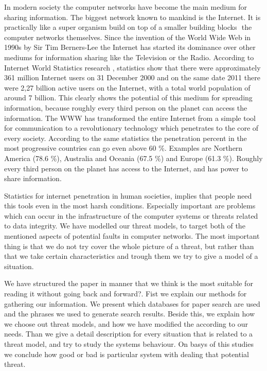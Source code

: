 In modern society the computer networks have become the main medium for sharing information. The  biggest network known to mankind is the Internet. It is practically like a super organism build on top of a smaller building blocks  the computer networks themselves. Since the invention of the World Wide Web in 1990s by Sir Tim Berners-Lee \cite{web:timbernerslee} the Internet has started its dominance over other mediums for information sharing like the Television or the Radio. According to Internet World Statistics research \cite{web: internetworldstats}, statistics show that there were approximately 361 million Internet users on 31 December 2000 and on the same date 2011 there were 2,27 billion active users on the Internet, with a total world population of around 7 billion. This clearly shows the potential of this medium for spreading information, because roughly every third person on the planet can access the information. The WWW has transformed the entire Internet from a simple tool for communication to a revolutionary technology which penetrates to the core of every society. According to the same statistics \cite{web:internetworldstats} the penetration percent in the most progressive countries can go even above 60 \%. Examples are Northern America (78.6 \%), Australia and Oceania (67.5 \%) and Europe (61.3 \%). Roughly every third person on the planet has access to the Internet, and has power to share information. 

Statistics for internet penetration in human societies, implies that people need this tools even in the most harsh conditions. Especially important are problems which can occur in the infrastructure of the computer systems or threats related to data integrity. We have modelled our threat models, to target both of the mentioned aspects of potential faults in computer networks. The most important thing is that we do not try cover the whole picture of a threat, but rather than that we take certain characteristics and trough them we try to give a model of a situation.

We have structured the paper in manner that we think is the most suitable for reading it without going back and forward?. Fist we explain our methods for gathering our information. We present which databases for paper search are used and the phrases we used to generate search results. Beside this, we explain how we choose out threat models, and how we have modified the according to our needs. Than we give a detail description for every situation that is related to a threat model, and try to study the systems behaviour. On basys of this studies we conclude how good or bad is particular system with dealing that potential threat.
 
